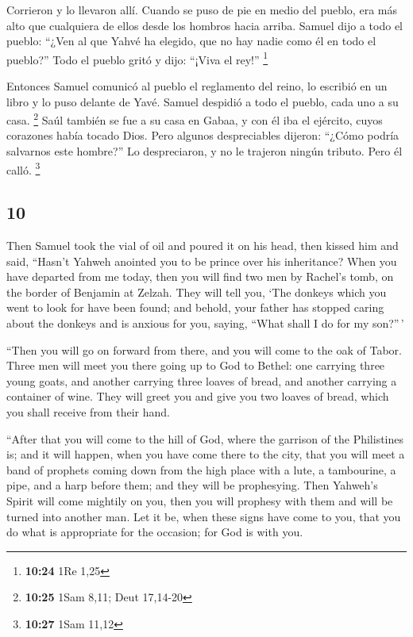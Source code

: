 \begin{paracol}{2}
 Corrieron y lo llevaron allí. Cuando se puso de pie en
medio del pueblo, era más alto que cualquiera de ellos desde los hombros
hacia arriba.  Samuel dijo a todo el pueblo: ``¿Ven al
que Yahvé ha elegido, que no hay nadie como él en todo el pueblo?'' Todo
el pueblo gritó y dijo: ``¡Viva el rey!'' \footnote{\textbf{10:24} 1Re
  1,25}

 Entonces Samuel comunicó al pueblo el reglamento del
reino, lo escribió en un libro y lo puso delante de Yavé. Samuel
despidió a todo el pueblo, cada uno a su casa. \footnote{\textbf{10:25}
  1Sam 8,11; Deut 17,14-20}  Saúl también se fue a su
casa en Gabaa, y con él iba el ejército, cuyos corazones había tocado
Dios.  Pero algunos despreciables dijeron: ``¿Cómo podría
salvarnos este hombre?'' Lo despreciaron, y no le trajeron ningún
tributo. Pero él calló. \footnote{\textbf{10:27} 1Sam 11,12}

\switchcolumn
\begin{otherlanguage}{english}

\hypertarget{section-19}{%
\section{10}\label{section-19}}

 Then Samuel took the vial of oil and poured it on his
head, then kissed him and said, ``Hasn't Yahweh anointed you to be
prince over his inheritance?  When you have departed from
me today, then you will find two men by Rachel's tomb, on the border of
Benjamin at Zelzah. They will tell you, `The donkeys which you went to
look for have been found; and behold, your father has stopped caring
about the donkeys and is anxious for you, saying, ``What shall I do for
my son?''\,'

 ``Then you will go on forward from there, and you will
come to the oak of Tabor. Three men will meet you there going up to God
to Bethel: one carrying three young goats, and another carrying three
loaves of bread, and another carrying a container of wine.
 They will greet you and give you two loaves of bread,
which you shall receive from their hand.

 ``After that you will come to the hill of God, where the
garrison of the Philistines is; and it will happen, when you have come
there to the city, that you will meet a band of prophets coming down
from the high place with a lute, a tambourine, a pipe, and a harp before
them; and they will be prophesying.  Then Yahweh's Spirit
will come mightily on you, then you will prophesy with them and will be
turned into another man.  Let it be, when these signs have
come to you, that you do what is appropriate for the occasion; for God
is with you.


\end{otherlanguage}
\end{paracol}
